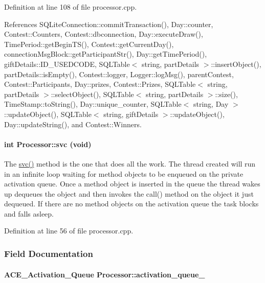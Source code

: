 Definition at line 108 of file processor.cpp.

References SQLite\-Connection::commit\-Transaction(), Day::counter, Contest::Counters, Contest::dbconnection, Day::execute\-Draw(), Time\-Period::get\-Begin\-TS(), Contest::get\-Current\-Day(), connection\-Msg\-Block::get\-Participant\-Str(), Day::get\-Time\-Period(), gift\-Details::ID\_\-USEDCODE, SQLTable$<$ string, part\-Details $>$::insert\-Object(), part\-Details::is\-Empty(), Contest::logger, Logger::log\-Msg(), parent\-Contest, Contest::Participants, Day::prizes, Contest::Prizes, SQLTable$<$ string, part\-Details $>$::select\-Object(), SQLTable$<$ string, part\-Details $>$::size(), Time\-Stamp::to\-String(), Day::unique\_\-counter, SQLTable$<$ string, Day $>$::update\-Object(), SQLTable$<$ string, gift\-Details $>$::update\-Object(), Day::update\-String(), and Contest::Winners.\hypertarget{classProcessor_Processora4}{
\paragraph[svc]{\setlength{\rightskip}{0pt plus 5cm}int Processor::svc (void)}\hfill}
\label{classProcessor_Processora4}


The \hyperlink{classProcessor_Processora4}{svc()} method is the one that does all the work. The thread created will run in an infinite loop waiting for method objects to be enqueued on the private activation queue. Once a method object is inserted in the queue the thread wakes up dequeues the object and then invokes the call() method on the object it just dequeued. If there are no method objects on the activation queue the task blocks and falls asleep. 

Definition at line 56 of file processor.cpp.

\subsubsection{Field Documentation}
\hypertarget{classProcessor_Processoro2}{
\paragraph[activation\_\-queue\_\-]{\setlength{\rightskip}{0pt plus 5cm}ACE\_\-Activation\_\-Queue Processor::activation\_\-queue\_\-}\hfill}
\label{classProcessor_Processoro2}




